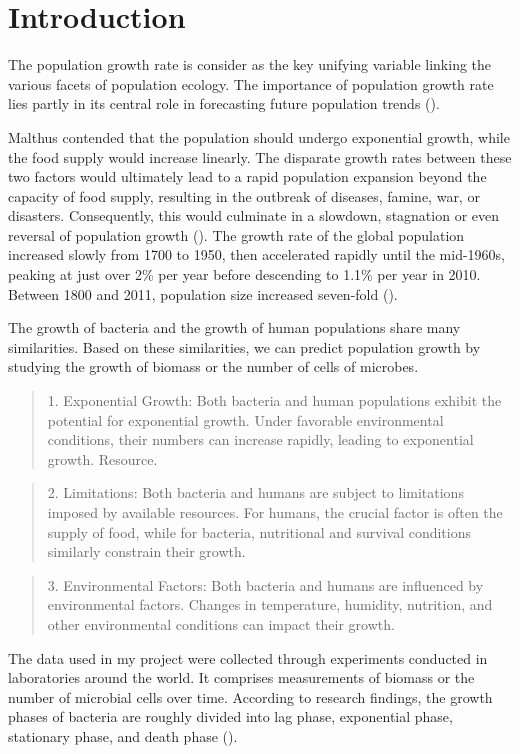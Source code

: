 \documentclass[11pt]{article}
\begin{document}
\section{Introduction}
The population growth rate is consider as the key unifying variable linking the various facets of population ecology. The importance of population growth rate lies partly in its central role in forecasting future population trends (\cite{sibly_hone_2002}).\par
Malthus contended that the population should undergo exponential growth, while the food supply would increase linearly. The disparate growth rates between these two factors would ultimately lead to a rapid population expansion beyond the capacity of food supply, resulting in the outbreak of diseases, famine, war, or disasters. Consequently, this would culminate in a slowdown, stagnation or even reversal of population growth (\cite{malthus_population_1798}). The growth rate of the global population increased slowly from 1700 to 1950, then accelerated rapidly until the mid-1960s, peaking at just over 2\% per year before descending to 1.1\% per year in 2010. Between 1800 and 2011, population size increased seven-fold (\cite{lee_outlook_2011}).\par
The growth of bacteria and the growth of human populations share many similarities. Based on these similarities, we can predict population growth by studying the growth of biomass or the number of cells of microbes.\par
\begin{quote} 
1. Exponential Growth: Both bacteria and human populations exhibit the potential for exponential growth. Under favorable environmental conditions, their numbers can increase rapidly, leading to exponential growth. Resource.
\end{quote}
\begin{quote} 
2. Limitations: Both bacteria and humans are subject to limitations imposed by available resources. For humans, the crucial factor is often the supply of food, while for bacteria, nutritional and survival conditions similarly constrain their growth.
\end{quote}
\begin{quote} 
3. Environmental Factors: Both bacteria and humans are influenced by environmental factors. Changes in temperature, humidity, nutrition, and other environmental conditions can impact their growth.
\end{quote}

The data used in my project were collected through experiments conducted in laboratories around the world. It comprises measurements of biomass or the number of microbial cells over time. According to research findings, the growth phases of bacteria are roughly divided into lag phase, exponential phase, stationary phase, and death phase (\cite{maier_book_2015}).\par
\end{document}
